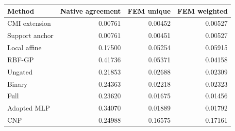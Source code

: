 \begin{tabular}{lrrr}\toprule
Method & Native agreement & FEM unique & FEM weighted\\\midrule
CMI extension & 0.00761 & 0.00452 & 0.00527\\
Support anchor & 0.00761 & 0.00451 & 0.00527\\
Local affine & 0.17500 & 0.05254 & 0.05915\\
RBF-GP & 0.41736 & 0.05371 & 0.04158\\
Ungated & 0.21853 & 0.02688 & 0.02309\\
Binary & 0.24363 & 0.02218 & 0.02323\\
Full & 0.23620 & 0.01675 & 0.01456\\
Adapted MLP & 0.34070 & 0.01889 & 0.01792\\
CNP & 0.24988 & 0.16575 & 0.17161\\
\bottomrule\end{tabular}